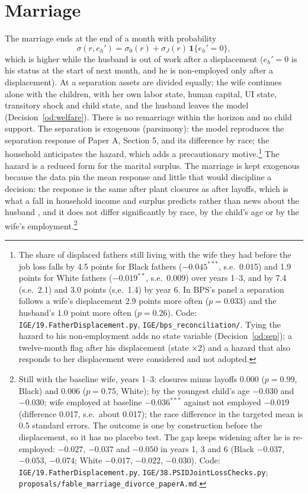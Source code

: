 \documentclass[11pt]{article}
\newcommand{\code}[1]{\texttt{#1}}
\newcommand{\1}{\mathbf{1}}
\begin{document}
\section{Marriage}\label{sec:marriage}

The marriage ends at the end of a month with probability
\begin{equation}\label{eq:sep}
  \sigma(r, e_h') = \sigma_0(r) + \sigma_J(r)\, \1\{e_h' = 0\},
\end{equation}
which is higher while the husband is out of work after a displacement ($e_h' = 0$ is his status at the start of next
month, and he is non-employed only after a displacement). At a separation assets are divided equally; the wife continues
alone with the children, with her own labor state, human capital, UI state, transitory shock and child state, and the
husband leaves the model (Decision~\ref{od:welfare}). There is no remarriage within the horizon and no child support. The separation is exogenous (parsimony): the
model reproduces the separation response of Paper A, Section 5, and its difference by race; the household anticipates
the hazard, which adds a precautionary motive.\footnote{The share of displaced fathers still living with the wife they
had before the job loss falls by 4.5 points for Black fathers ($-0.045^{***}$, s.e.\ 0.015) and 1.9 points for White
fathers ($-0.019^{**}$, s.e.\ 0.009) over years 1--3, and by 7.4 (s.e.\ 2.1) and 3.0 points (s.e.\ 1.4) by year 6. In
BPS's panel a separation follows a wife's displacement 2.9 points more often ($p=0.033$) and the husband's 1.0 point
more often ($p=0.26$). Code: \code{IGE/19.FatherDisplacement.py}, \code{IGE/bps\_reconciliation/}. Tying the hazard to his
non-employment adds no state variable (Decision~\ref{od:sep}); a twelve-month flag after his displacement (state
$\times 2$) and a hazard that also responds to her displacement were considered and not adopted.} The hazard is a
reduced form for the marital surplus. The marriage is kept exogenous because the data pin the mean response and little
that would discipline a decision: the response is the same after plant closures as after layoffs, which is what a fall
in household income and surplus predicts rather than news about the husband \citep{charles2004job}, and it does not
differ significantly by race, by the child's age or by the wife's employment.\footnote{Still with the baseline wife,
years 1--3: closures minus layoffs 0.000 ($p = 0.99$, Black) and 0.006 ($p = 0.75$, White); by the youngest child's age
$-0.030$ and $-0.030$; wife employed at baseline $-0.036^{***}$ against not employed $-0.019$ (difference 0.017, s.e.\
about 0.017); the race difference in the targeted mean is 0.5 standard errors. The outcome is one by construction
before the displacement, so it has no placebo test. The gap keeps widening after he is re-employed: $-0.027$, $-0.037$
and $-0.050$ in years 1, 3 and 6 (Black $-0.037$, $-0.053$, $-0.074$; White $-0.017$, $-0.022$, $-0.030$). Code:
\code{IGE/19.FatherDisplacement.py}, \code{IGE/38.PSIDJointLossChecks.py}; \code{proposals/fable\_marriage\_divorce\_paperA.md}.}
\end{document}
